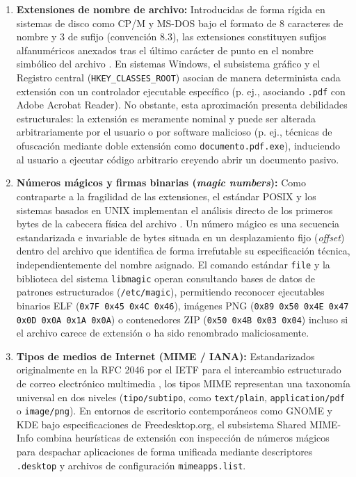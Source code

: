 \documentclass[12pt]{article}
\begin{document}
\begin{enumerate}[noitemsep, topsep=2pt]
    \item \textbf{Extensiones de nombre de archivo:} Introducidas de forma rígida en sistemas de disco como CP/M y MS-DOS bajo el formato de 8 caracteres de nombre y 3 de sufijo (convención 8.3), las extensiones constituyen sufijos alfanuméricos anexados tras el último carácter de punto en el nombre simbólico del archivo \parencite[\S 10.1.3, p.\ 340]{silberschatz2006fundamentos}. En sistemas Windows, el subsistema gráfico y el Registro central (\texttt{HKEY\_CLASSES\_ROOT}) asocian de manera determinista cada extensión con un controlador ejecutable específico (p. ej., asociando \texttt{.pdf} con Adobe Acrobat Reader). No obstante, esta aproximación presenta debilidades estructurales: la extensión es meramente nominal y puede ser alterada arbitrariamente por el usuario o por software malicioso (p. ej., técnicas de ofuscación mediante doble extensión como \texttt{documento.pdf.exe}), induciendo al usuario a ejecutar código arbitrario creyendo abrir un documento pasivo.
    \item \textbf{Números mágicos y firmas binarias (\textit{magic numbers}):} Como contraparte a la fragilidad de las extensiones, el estándar POSIX y los sistemas basados en UNIX implementan el análisis directo de los primeros bytes de la cabecera física del archivo \parencite[\S 8.2.1, p.\ 422]{carretero2001sistemas}. Un número mágico es una secuencia estandarizada e invariable de bytes situada en un desplazamiento fijo (\textit{offset}) dentro del archivo que identifica de forma irrefutable su especificación técnica, independientemente del nombre asignado. El comando estándar \texttt{file} y la biblioteca del sistema \texttt{libmagic} operan consultando bases de datos de patrones estructurados (\texttt{/etc/magic}), permitiendo reconocer ejecutables binarios ELF (\texttt{0x7F 0x45 0x4C 0x46}), imágenes PNG (\texttt{0x89 0x50 0x4E 0x47 0x0D 0x0A 0x1A 0x0A}) o contenedores ZIP (\texttt{0x50 0x4B 0x03 0x04}) incluso si el archivo carece de extensión o ha sido renombrado maliciosamente.
    \item \textbf{Tipos de medios de Internet (MIME / IANA):} Estandarizados originalmente en la RFC 2046 por el IETF para el intercambio estructurado de correo electrónico multimedia \parencite{freed1996multipurpose}, los tipos MIME representan una taxonomía universal en dos niveles (\texttt{tipo/subtipo}, como \texttt{text/plain}, \texttt{application/pdf} o \texttt{image/png}). En entornos de escritorio contemporáneos como GNOME y KDE bajo especificaciones de Freedesktop.org, el subsistema Shared MIME-Info combina heurísticas de extensión con inspección de números mágicos para despachar aplicaciones de forma unificada mediante descriptores \texttt{.desktop} y archivos de configuración \texttt{mimeapps.list}.
\end{enumerate}
\end{document}
